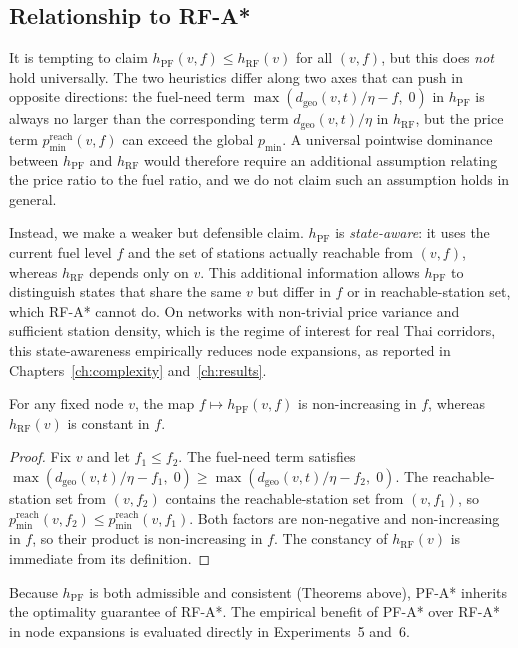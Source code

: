 \subsection{Relationship to RF-A*}

It is tempting to claim $h_{\mathrm{PF}}(v,f) \leq h_{\mathrm{RF}}(v)$ for all $(v,f)$, but
this does \emph{not} hold universally.
The two heuristics differ along two axes that can push in opposite directions: the
fuel-need term $\max(d_{\mathrm{geo}}(v,t)/\eta - f,\; 0)$ in $h_{\mathrm{PF}}$ is always
no larger than the corresponding term $d_{\mathrm{geo}}(v,t)/\eta$ in $h_{\mathrm{RF}}$,
but the price term $p_{\min}^{\mathrm{reach}}(v,f)$ can exceed the global $p_{\min}$.
A universal pointwise dominance between $h_{\mathrm{PF}}$ and $h_{\mathrm{RF}}$ would
therefore require an additional assumption relating the price ratio to the fuel ratio, and we
do not claim such an assumption holds in general.

Instead, we make a weaker but defensible claim.
$h_{\mathrm{PF}}$ is \emph{state-aware}: it uses the current fuel level $f$ and the set of
stations actually reachable from $(v,f)$, whereas $h_{\mathrm{RF}}$ depends only on $v$.
This additional information allows $h_{\mathrm{PF}}$ to distinguish states that share the
same $v$ but differ in $f$ or in reachable-station set, which RF-A* cannot do.
On networks with non-trivial price variance and sufficient station density, which is the regime of
interest for real Thai corridors, this state-awareness empirically reduces node expansions,
as reported in Chapters~\ref{ch:complexity} and~\ref{ch:results}.

\begin{proposition}
    For any fixed node $v$, the map $f \mapsto h_{\mathrm{PF}}(v,f)$ is non-increasing in
    $f$, whereas $h_{\mathrm{RF}}(v)$ is constant in $f$.
\end{proposition}
\begin{proof}
    Fix $v$ and let $f_1 \leq f_2$.
    The fuel-need term satisfies
    $\max(d_{\mathrm{geo}}(v,t)/\eta - f_1,\; 0)
     \geq \max(d_{\mathrm{geo}}(v,t)/\eta - f_2,\; 0)$.
    The reachable-station set from $(v,f_2)$ contains the reachable-station set from
    $(v,f_1)$, so
    $p_{\min}^{\mathrm{reach}}(v,f_2) \leq p_{\min}^{\mathrm{reach}}(v,f_1)$.
    Both factors are non-negative and non-increasing in $f$, so their product is
    non-increasing in $f$.
    The constancy of $h_{\mathrm{RF}}(v)$ is immediate from its definition.
\end{proof}

Because $h_{\mathrm{PF}}$ is both admissible and consistent (Theorems above), PF-A*
inherits the optimality guarantee of RF-A*.
The empirical benefit of PF-A* over RF-A* in node expansions is evaluated directly in
Experiments~5 and~6.
